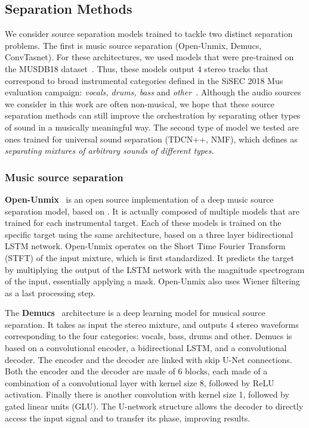 \documentclass{article}
\begin{document}
		\subsection{Separation Methods}
	We consider source separation models trained to tackle two distinct separation problems. The first is music source separation (Open-Unmix, Demucs, ConvTasnet). For these architectures, we used models that were pre-trained on the MUSDB18 dataset~\cite{MUSDB18}. Thus, these models output 4 stereo tracks that correspond to broad instrumental categories defined in the SiSEC 2018 Mus evaluation campaign: \textit{vocals, drums, bass} and \textit{other}~\cite{Stoter_SiSEC}. Although the audio sources we consider in this work are often non-musical, we hope that these source separation methods can still improve the orchestration by separating other types of sound in a musically meaningful way.
	The second type of model we tested are ones trained for universal sound separation (TDCN++, NMF), which \cite{tdcnpp} defines as \textit{separating mixtures of arbitrary sounds of different types}. 
			
			\subsubsection{Music source separation}
			\textbf{Open-Unmix}~\cite{open-unmix} is an open source implementation of a deep music source separation model, based on \cite{Uhlich2017}. It is actually composed of multiple models that are trained for each instrumental target. Each of these models is trained on the specific target using the same architecture, based on a three layer bidirectional LSTM network. Open-Unmix operates on the Short Time Fourier Transform (STFT) of the input mixture, which is first standardized. It predicts the target by multiplying the output of the LSTM network with the magnitude spectrogram of the input, essentially applying a mask. Open-Unmix also uses Wiener filtering as a last processing step.
			
			The \textbf{Demucs}~\cite{demucs} architecture is a deep learning model for musical source separation. It takes as input the stereo mixture, and outputs 4 stereo waveforms corresponding to the four categories: vocals, bass, drums and other. Demucs is based on a convolutional encoder, a bidirectional LSTM, and a convolutional decoder. The encoder and the decoder are linked with skip U-Net connections. Both the encoder and the decoder are made of 6 blocks, each made of a combination of a convolutional layer with kernel size 8, followed by ReLU activation. Finally there is another convolution with kernel size 1, followed by gated linear units (GLU). The U-network structure allows the decoder to directly access the input signal and to transfer its phase, improving results.	
\end{document}

